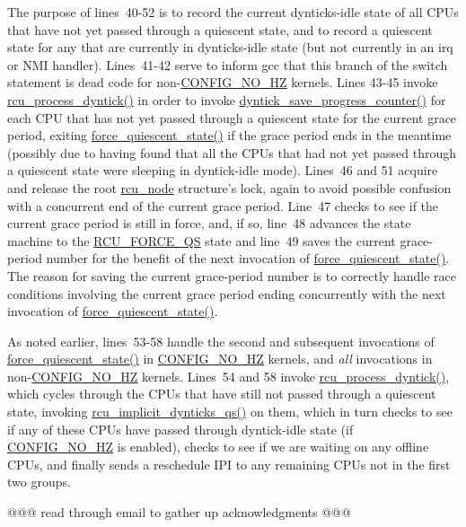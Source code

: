 The purpose of lines~40-52 is to record the current dynticks-idle state
of all CPUs that have not yet passed through a quiescent state, and
to record a quiescent state for any that are currently in dynticks-idle
state (but not currently in an irq or NMI handler).
Lines~41-42 serve to inform gcc that this branch of the switch statement
is dead code for non-\url{CONFIG_NO_HZ} kernels.
Lines 43-45 invoke \url{rcu_process_dyntick()} in order to invoke
\url{dyntick_save_progress_counter()} for each CPU that has not yet
passed through a quiescent state for the current grace period,
exiting \url{force_quiescent_state()} if the grace period ends in
the meantime (possibly due to having found that all the CPUs that
had not yet passed through a quiescent state were sleeping in
dyntick-idle mode).
Lines~46 and 51 acquire and release the root \url{rcu_node} structure's
lock, again to avoid possible confusion with a concurrent end of the
current grace period.
Line~47 checks to see if the current grace period is still in force, and,
if so, line~48 advances the state machine to the \url{RCU_FORCE_QS} state
and line~49 saves the current grace-period number for the benefit of
the next invocation of \url{force_quiescent_state()}.
The reason for saving the current grace-period number is to correctly
handle race conditions involving the current grace period ending
concurrently with the next invocation of \url{force_quiescent_state()}.

As noted earlier, lines~53-58 handle the second and subsequent invocations
of \url{force_quiescent_state()} in \url{CONFIG_NO_HZ} kernels, and \emph{all}
invocations in non-\url{CONFIG_NO_HZ} kernels.
Lines~54 and 58 invoke \url{rcu_process_dyntick()}, which cycles through
the CPUs that have still not passed through a quiescent state, invoking
\url{rcu_implicit_dynticks_qs()} on them, which in turn checks to see
if any of these CPUs have passed through dyntick-idle state (if
\url{CONFIG_NO_HZ} is enabled), checks to see if we are waiting on
any offline CPUs, and finally sends a reschedule IPI to any remaining
CPUs not in the first two groups.

@@@ read through email to gather up acknowledgments @@@
